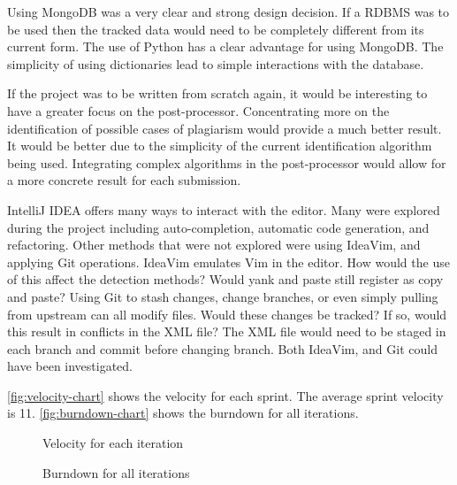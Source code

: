 Using MongoDB was a very clear and strong design decision. If a RDBMS was to be used then the tracked data would need to be completely different from its current form. The use of Python has a clear advantage for using MongoDB. The simplicity of using dictionaries lead to simple interactions with the database.

If the project was to be written from scratch again, it would be interesting to have a greater focus on the post-processor. Concentrating more on the identification of possible cases of plagiarism would provide a much better result. It would be better due to the simplicity of the current identification algorithm being used. Integrating complex algorithms in the post-processor would allow for a more concrete result for each submission.

IntelliJ IDEA offers many ways to interact with the editor. Many were explored during the project including auto-completion, automatic code generation, and refactoring. Other methods that were not explored were using IdeaVim, and applying Git operations. IdeaVim emulates Vim in the editor. How would the use of this affect the detection methods? Would yank and paste still register as copy and paste? Using Git to stash changes, change branches, or even simply pulling from upstream can all modify files. Would these changes be tracked? If so, would this result in conflicts in the XML file? The XML file would need to be staged in each branch and commit before changing branch. Both IdeaVim, and Git could have been investigated.

\autoref{fig:velocity-chart} shows the velocity for each sprint. The average sprint velocity is 11. \autoref{fig:burndown-chart} shows the burndown for all iterations.

\begin{figure}[H]
  \centering
  \caption[Velocity chart]{Velocity for each iteration}
  \label{fig:velocity-chart}
\end{figure}

\begin{figure}[H]
  \centering
  \caption[Burndown chart]{Burndown for all iterations}
  \label{fig:burndown-chart}
\end{figure}
